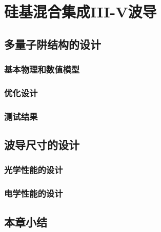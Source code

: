 \chapter{硅基混合集成III-V波导}
\section{多量子阱结构的设计}
\subsection{基本物理和数值模型}
\subsection{优化设计}
\subsection{测试结果}
\section{波导尺寸的设计}
\subsection{光学性能的设计}
\subsection{电学性能的设计}
\section{本章小结}